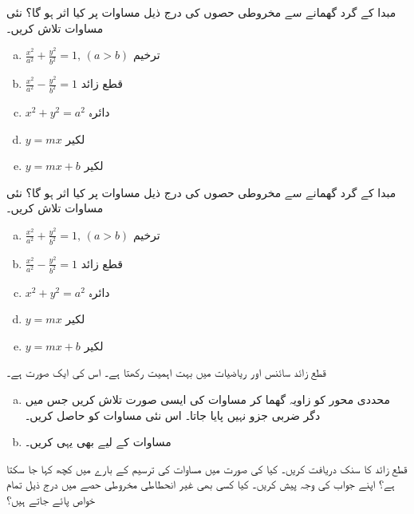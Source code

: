 مبدا کے گرد  گھمانے سے مخروطی  حصوں  کی  درج ذیل مساوات پر کیا اثر ہو گا؟ نئی مساوات تلاش کریں۔
\begin{enumerate}[a.]
\item
$\tfrac{x^2}{a^2}+\tfrac{y^2}{b^2}=1,\, (a>b)$\quad
ترخیم
\item
$\tfrac{x^2}{a^2}-\tfrac{y^2}{b^2}=1$\quad
قطع زائد
\item
$x^2+y^2=a^2$\quad 
دائرہ
\item
$y=mx$\quad
لکیر
\item
$y=mx+b$\quad
لکیر
\end{enumerate} 
مبدا کے گرد  گھمانے سے  مخروطی  حصوں کی درج ذیل مساوات پر کیا اثر ہو گا؟ نئی مساوات تلاش کریں۔
\begin{enumerate}[a.]
\item
$\tfrac{x^2}{a^2}+\tfrac{y^2}{b^2}=1,\, (a>b)$\quad
ترخیم
\item
$\tfrac{x^2}{a^2}-\tfrac{y^2}{b^2}=1$\quad
قطع زائد
\item
$x^2+y^2=a^2$\quad
دائرہ
\item
$y=mx$\quad
لکیر
\item
$y=mx+b$\quad
لکیر
\end{enumerate}
قطع زائد   سائنس اور ریاضیات میں بہت اہمیت رکھتا ہے۔ اس  کی ایک صورت  ہے۔ 
\begin{enumerate}[a.]
\item
محددی محور کو زاویہ گھما کر  مساوات  کی  ایسی صورت تلاش کریں جس میں  دگر ضربی  جزو  نہیں پایا جاتا۔ اس نئی مساوات کو حاصل کریں۔
\item
مساوات  کے لیے بھی یہی کریں۔
\end{enumerate}
قطع زائد  کا سنک دریافت کریں۔
کیا  کی صورت میں مساوات  کی ترسیم کے بارے میں کچھ کہا جا سکتا ہے؟ اپنے جواب کی وجہ پیش کریں۔
کیا کسی بھی غیر انحطاطی مخروطی  حصے    میں درج ذیل تمام خواص پائے جاتے ہیں؟

